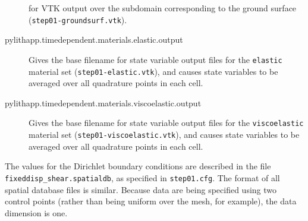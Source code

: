 \begin{description}
for VTK output over the subdomain corresponding to the ground surface
\linebreak{}
(\texttt{step01-groundsurf.vtk}).
\item [{pylithapp.timedependent.materials.elastic.output}] Gives the base
filename for state variable output files for the \texttt{elastic}
material set (\texttt{step01-elastic.vtk}), and causes state variables
to be averaged over all quadrature points in each cell.
\item [{pylithapp.timedependent.materials.viscoelastic.output}] Gives the
base filename for state variable output files for the \texttt{viscoelastic}
material set (\texttt{step01-viscoelastic.vtk}), and causes state
variables to be averaged over all quadrature points in each cell.
\end{description}
The values for the Dirichlet boundary conditions are described in
the file \texttt{fixeddisp\_shear.spatialdb}, as specified in \texttt{step01.cfg}.
The format of all spatial database files is similar. Because data
are being specified using two control points (rather than being uniform
over the mesh, for example), the data dimension is one.

